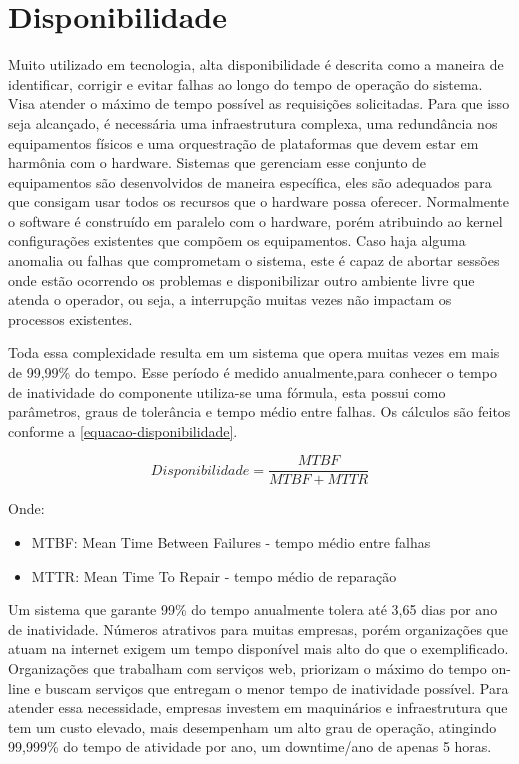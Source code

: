 \chapter{Disponibilidade}

Muito utilizado em tecnologia, alta disponibilidade é descrita como a maneira de identificar, corrigir e evitar falhas ao longo
do tempo de operação do sistema. Visa atender o máximo de tempo possível as requisições solicitadas. Para que isso seja
alcançado, é necessária uma infraestrutura complexa, uma redundância nos equipamentos físicos e uma orquestração de plataformas
que devem estar em harmônia com o hardware. Sistemas que gerenciam esse conjunto de equipamentos são desenvolvidos de maneira
específica, eles são adequados para que consigam usar todos os recursos que o hardware possa oferecer. Normalmente o software é
construído em paralelo com o hardware, porém atribuindo ao kernel configurações existentes que compõem os equipamentos.
Caso haja alguma anomalia ou falhas que comprometam o sistema, este é capaz de abortar sessões onde estão ocorrendo os problemas
e disponibilizar outro ambiente livre que atenda o operador, ou seja, a interrupção muitas vezes não impactam os processos
existentes.

Toda essa complexidade resulta em um sistema que opera muitas vezes em mais de 99,99\% do tempo. Esse período é medido
anualmente,para conhecer o tempo de inatividade do componente utiliza-se uma fórmula, esta possui como parâmetros, graus
de tolerância e tempo médio entre falhas.
Os cálculos são feitos conforme a \autoref{equacao-disponibilidade}.

\begin{equation}\label{equacao-disponibilidade}
Disponibilidade = \frac{MTBF}{MTBF + MTTR}
\end{equation}

Onde:

\begin{itemize}

	\item MTBF: Mean Time Between Failures - tempo médio entre falhas

	\item MTTR: Mean Time To Repair - tempo médio de reparação

\end{itemize}

Um sistema que garante 99\% do tempo anualmente tolera até 3,65 dias por ano de inatividade. Números atrativos para muitas
empresas, porém organizações que atuam na internet exigem um tempo disponível mais alto do que o exemplificado. Organizações
que trabalham com serviços web, priorizam o máximo do tempo on-line e buscam serviços que entregam o menor tempo de inatividade
possível. Para atender essa necessidade, empresas investem em maquinários e infraestrutura que tem um custo elevado, mais
desempenham um alto grau de operação, atingindo 99,999\% do tempo de atividade por ano, um downtime/ano de apenas 5 horas.


